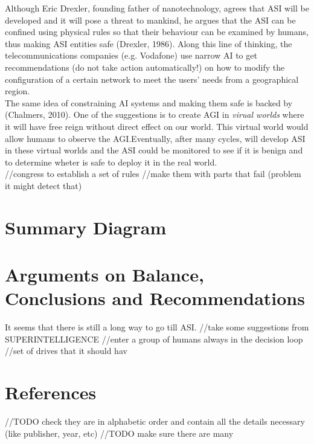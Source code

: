 \documentclass[11pt]{article}
\begin{document}
Although Eric Drexler, founding father of nanotechnology, agrees that ASI will be developed and it will pose a threat to mankind, he argues that the ASI can be confined using physical rules so that their behaviour can be examined by humans, thus making ASI entities safe (Drexler, 1986). Along this line of thinking, the telecommunications companies (e.g. Vodafone) use narrow AI to get recommendations (do not take action automatically!) on how to modify the configuration of a certain network to meet the users' needs from a geographical region.\\ 

The same idea of constraining AI systems and making them safe is backed by (Chalmers, 2010). One of the suggestions is to create AGI in \textit{virual worlds} where it will have free reign without direct effect on our world. This virtual world would allow humans to observe the AGI.Eventually, after many cycles, will develop ASI in these virtual worlds and the ASI could be monitored to see if it is benign and to determine wheter is safe to deploy it in the real world.\\
  
//congress to establish a set of rules
//make them with parts that fail (problem it might detect that)

\section*{Summary Diagram}

\section*{Arguments on Balance, Conclusions and Recommendations}
	It seems that there is still a long way to go till ASI.
//take some suggestions from SUPERINTELLIGENCE
//enter a group of humans always in the decision loop
//set of drives that it should hav


\section*{References}
//TODO check they are in alphabetic order and contain all the details necessary (like publisher, year, etc)
//TODO make sure there are many
\end{document}
